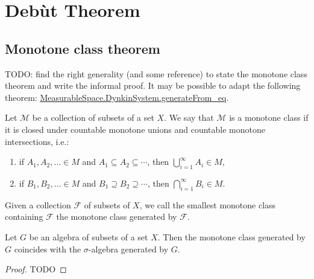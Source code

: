\chapter{Debùt Theorem}
\label{chap:debut_theorem}

\section{Monotone class theorem}

TODO: find the right generality (and some reference) to state the monotone class theorem and write the informal proof. It may be possible to adapt the following theorem: \href{https://leanprover-community.github.io/mathlib4_docs/Mathlib/MeasureTheory/PiSystem.html#MeasurableSpace.DynkinSystem.generateFrom_eq}{MeasurableSpace.DynkinSystem.generateFrom\_eq}.

\begin{definition}\label{def:monotone_class}
  Let $\mathcal{M}$ be a collection of subsets of a set $X$. We say that $\mathcal{M}$ is a monotone class if it is closed under countable monotone unions and countable monotone intersections, i.e.:
  \begin{enumerate}
    \item if \( A_1, A_2, \ldots \in M \) and \( A_1 \subseteq A_2 \subseteq \cdots \), then
    \( \bigcup_{i=1}^\infty A_i \in M \),
    \item if \( B_1, B_2, \ldots \in M \) and \( B_1 \supseteq B_2 \supseteq \cdots \), then
    \( \bigcap_{i=1}^\infty B_i \in M \).
  \end{enumerate}
  Given a collection $\mathcal{F}$ of subsets of $X$, we call the smallest monotone class containing $\mathcal{F}$ the monotone class generated by $\mathcal{F}$.
\end{definition}

\begin{theorem}\label{thm:monotone_class}
  Let \(G\) be an algebra of subsets of a set \(X\). Then the monotone class generated by \(G\) coincides with the $\sigma$-algebra generated by \(G\).
\end{theorem}

\begin{proof}
  TODO
\end{proof}


